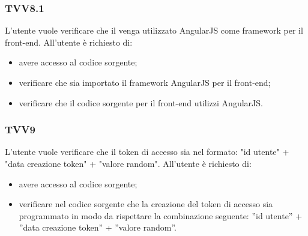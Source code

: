 		\subsubsection{TVV8.1}
			L'utente vuole verificare che il venga utilizzato AngularJS come framework per il front-end. All'utente è richiesto di:
			\begin{itemize}
				\item avere accesso al codice sorgente;
				\item verificare che sia importato il framework AngularJS per il front-end;
				\item verificare che il codice sorgente per il front-end utilizzi AngularJS.
			\end{itemize}
			
		\subsubsection{TVV9}
			L'utente vuole verificare che il token di accesso sia nel formato: "id utente" + "data creazione token" + "valore random". All'utente è richiesto di:
			\begin{itemize}
				\item avere accesso al codice sorgente;
				\item verificare nel codice sorgente che la creazione del token di accesso sia programmato in modo da rispettare la combinazione seguente: ''id utente'' + ''data creazione token'' + ''valore random''.
			\end{itemize}
			
\pagebreak